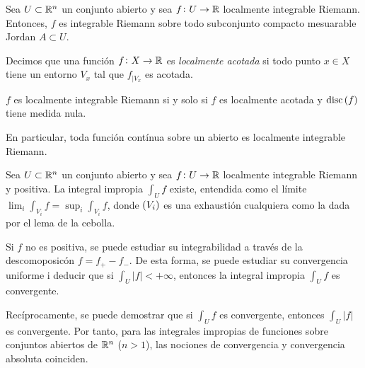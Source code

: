\begin{prop}
    Sea $U\subset \mathbb{R}^n$ un conjunto abierto y sea $f\colon U \to \mathbb{R}$ localmente integrable Riemann. Entonces, $f$ es integrable Riemann sobre todo subconjunto compacto mesuarable Jordan $A \subset U$.
\end{prop}

\begin{defi}
    Decimos que una función $f \colon X \to \mathbb{R}$ es \textit{localmente acotada} si todo punto $x \in X$ tiene un entorno $V_x$ tal que $f_{|V_x}$ es acotada.
\end{defi}

\begin{prop}
    $f$ es localmente integrable Riemann si y solo si $f$ es localmente acotada y $\operatorname{disc} \left( f \right)$ tiene medida nula.

    En particular, toda función contínua sobre un abierto es localmente integrable Riemann.
\end{prop}

\begin{col}
    Sea $U\subset \mathbb{R}^n$ un conjunto abierto y sea $f\colon U \to \mathbb{R}$ localmente integrable Riemann y positiva. La integral impropia $\int_U f$ existe, entendida como el límite $\lim_i \int_{V_i} f = \sup_i \int_{V_i} f$, donde $\left( V_i \right)$ es una exhaustión cualquiera como la dada por el lema de la cebolla.
\end{col}

\begin{obs}
    Si $f$ no es positiva, se puede estudiar su integrabilidad a través de la descomoposicón $f=f_+ - f_-$. De esta forma, se puede estudiar su convergencia uniforme i deducir que si $\int_U \left| f \right| < +\infty$, entonces la integral impropia $\int_U f$ es convergente.
\end{obs}


\begin{obs}
    Recíprocamente, se puede demostrar que si $\int_U f$ es convergente, entonces $\int_U \left| f \right|$ es convergente. Por tanto, para las integrales impropias de funciones sobre conjuntos abiertos de $\mathbb{R}^n$ ($n>1$), las nociones de convergencia y convergencia absoluta coinciden.
\end{obs}
